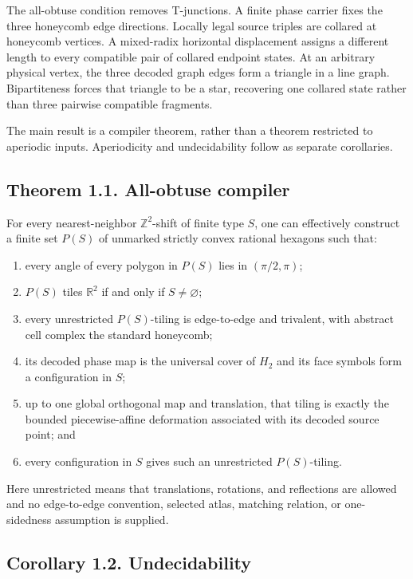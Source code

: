 \documentclass[11pt]{article}
\begin{document}
The all-obtuse condition removes T-junctions. A finite phase carrier fixes the
three honeycomb edge directions. Locally legal source triples are collared at
honeycomb vertices. A mixed-radix horizontal displacement assigns a different
length to every compatible pair of collared endpoint states. At an arbitrary
physical vertex, the three decoded graph edges form a triangle in a line
graph. Bipartiteness forces that triangle to be a star, recovering one
collared state rather than three pairwise compatible fragments.

The main result is a compiler theorem, rather than a theorem restricted to
aperiodic inputs. Aperiodicity and undecidability follow as separate
corollaries.

\subsection*{Theorem 1.1. All-obtuse compiler}

For every nearest-neighbor \(\mathbb Z^2\)-shift of finite type \(S\), one can
effectively construct a finite set \(P(S)\) of unmarked strictly convex
rational hexagons such that:

\begin{enumerate}
\item every angle of every polygon in \(P(S)\) lies in \((\pi/2,\pi)\);
\item \(P(S)\) tiles \(\mathbb R^2\) if and only if \(S\neq\varnothing\);
\item every unrestricted \(P(S)\)-tiling is edge-to-edge and trivalent, with
   abstract cell complex the standard honeycomb;
\item its decoded phase map is the universal cover of \(H_2\) and its face
   symbols form a configuration in \(S\);
\item up to one global orthogonal map and translation, that tiling is exactly
   the bounded piecewise-affine deformation associated with its decoded
   source point; and
\item every configuration in \(S\) gives such an unrestricted
   \(P(S)\)-tiling.
\end{enumerate}

Here unrestricted means that translations, rotations, and reflections are
allowed and no edge-to-edge convention, selected atlas, matching relation, or
one-sidedness assumption is supplied.

\subsection*{Corollary 1.2. Undecidability}
\end{document}

